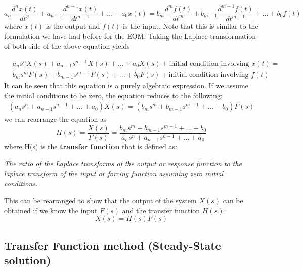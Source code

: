 \documentclass[12pt,a4paper]{article}
\begin{document}
\begin{equation}
a_n\frac{d^nx(t)}{dt^n} + a_{n-1}\frac{d^{n-1}x(t)}{dt^{n-1}} + ... + a_0x(t) = b_m\frac{d^mf(t)}{dt^m} + b_{m-1}\frac{d^{m-1}f(t)}{dt^{m-1}} + ... + b_0f(t)
\end{equation} 
where $x(t)$ is the output and $f(t)$ is the input. Note that this is similar to the formulation we have had before for the EOM. Taking the Laplace transformation of both side of the above equation yields

\begin{eqnarray}
&a_ns^nX(s) + a_{n-1}s^{n-1}X(s) + ... + a_0X(s) + \text{initial condition involving } x(t) =   \\
&b_ms^mF(s) + b_{m-1}s^{m-1}F(s) + ... + b_0F(s) + \text{initial condition involving } f(t)  \nonumber
\end{eqnarray}
It can be seen that this equation is a purely algebraic expression. If we assume the initial conditions to be zero, the equation reduces to the following:
\begin{eqnarray}
(a_ns^n + a_{n-1}s^{n-1} + ... + a_0)X(s) =  (b_ms^m + b_{m-1}s^{m-1} + ... + b_0)F(s) 
\end{eqnarray}
we can rearrange the equation as 
\begin{equation}
H(s) = \frac{X(s)}{F(s)} = \frac{b_ms^m + b_{m-1}s^{m-1} + ... + b_0}{a_ns^n + a_{n-1}s^{n-1} + ... + a_0}
\end{equation}
where H(s) is the \textbf{transfer function} that is defined as:

\textit{The ratio of the Laplace transforms of the output or response function to the laplace transform of the input or forcing function assuming zero initial conditions.}

This can be rearranged to show that the output of the system $X(s)$ can be obtained if we know the input $F(s)$ and the transfer function $H(s)$:
\begin{equation}
X(s) = H(s)F(s)
\end{equation}	


\subsection*{Transfer Function method (Steady-State solution)}
\end{document}
